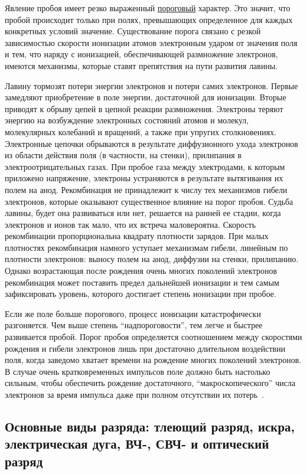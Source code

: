 \documentclass[10pt, a4paper]{article}
\begin{document}
Явление пробоя имеет резко выраженный \uline{пороговый} характер. Это значит, что пробой происходит только при полях, превышающих определенное для каждых конкретных условий значение. Существование порога связано с резкой зависимостью скорости ионизации атомов электронным ударом от значения поля и тем, что наряду с ионизацией, обеспечивающей размножение электронов, имеются механизмы, которые ставят препятствия на пути развития лавины.

Лавину тормозят потери энергии электронов и потери самих электронов. Первые замедляют приобретение в поле энергии, достаточной для ионизации. Вторые приводят к обрыву цепей в цепной реакции размножения. Электроны теряют энергию на возбуждение электронных состояний атомов и молекул, молекулярных колебаний и вращений, а также при упругих столкновениях. Электронные цепочки обрываются в результате диффузионного ухода электронов из области действия поля (в частности, на стенки), прилипания в электроотрицательных газах. При пробое газа между электродами, к которым приложено напряжение, электроны устраняются в результате вытягивания их полем на анод. Рекомбинация не принадлежит к числу тех механизмов гибели электронов, которые оказывают существенное влияние на порог пробоя. Судьба лавины, будет она развиваться или нет, решается на ранней ее стадии, когда электронов и ионов так мало, что их встреча маловероятна. Скорость рекомбинации пропорциональна квадрату плотности зарядов. При малых плотностях рекомбинация намного уступает механизмам гибели, линейным по плотности электронов: выносу полем на анод, диффузии на стенки, прилипанию. Однако возрастающая после рождения очень многих поколений электронов рекомбинация может поставить предел дальнейшей ионизации и тем самым зафиксировать уровень, которого достигает степень ионизации при пробое.

Если же поле больше порогового, процесс ионизации катастрофически разгоняется. Чем выше степень ``надпороговости'', тем легче и быстрее развивается пробой. Порог пробоя определяется соотношением между скоростями рождения и гибели электронов лишь при достаточно длительном воздействии поля, когда заведомо хватает времени на рождение многих поколений электронов. В случае очень кратковременных импульсов поле должно быть настолько сильным, чтобы обеспечить рождение достаточного, ``макроскопического'' числа электронов за время импульса даже при полном отсутствии их потерь~\cite{raizer}. 

\subsection{Основные виды разряда: тлеющий разряд, искра, электрическая дуга, ВЧ-, СВЧ- и оптический разряд}
\end{document}
